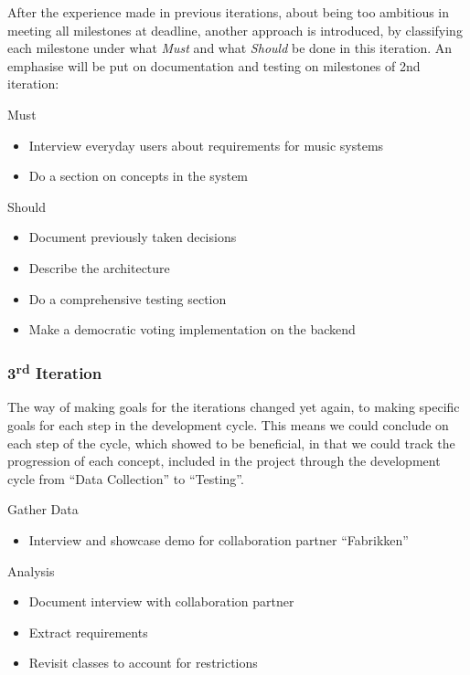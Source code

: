 After the experience made in previous iterations, about being too
ambitious in meeting all milestones at deadline, another approach is
introduced, by classifying each milestone under what \emph{Must} and
what \emph{Should} be done in this iteration. An emphasise will be put on documentation and testing on milestones of 2nd iteration:

Must
\begin{itemize}
        \item Interview everyday users about requirements for music systems
        \item Do a section on concepts in the system
\end{itemize}

Should
\begin{itemize}
        \item Document previously taken decisions
        \item Describe the architecture
        \item Do a comprehensive testing section
        \item Make a democratic voting implementation on the backend
\end{itemize}

\subsubsection{3\textsuperscript{rd} Iteration}

The way of making goals for the iterations changed yet again, to making specific goals for each step in the development cycle. This means we could conclude on each step of the cycle, which showed to be beneficial, in that we could track the progression of each concept, included in the project through the development cycle from \enquote{Data Collection} to \enquote{Testing}.

Gather Data
\begin{itemize}
  \item Interview and showcase demo for collaboration partner \enquote{Fabrikken}
\end{itemize}

Analysis
\begin{itemize}
  \item Document interview with collaboration partner
  \item Extract requirements
  \item Revisit classes to account for restrictions
\end{itemize}

